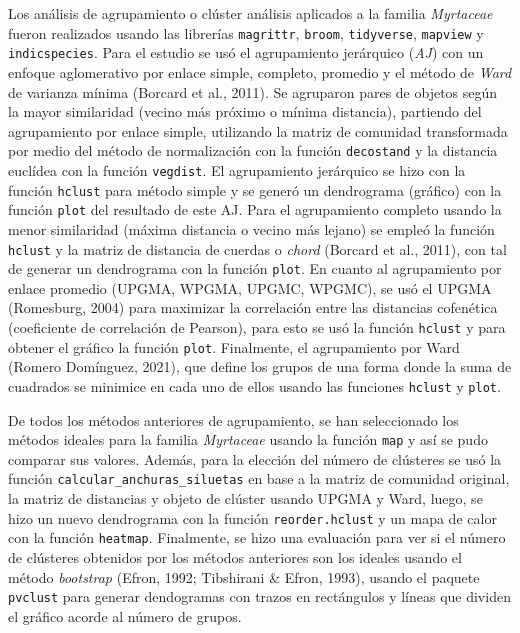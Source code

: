 \documentclass[11pt,]{article}
\begin{document}
Los análisis de agrupamiento o clúster análisis aplicados a la familia
\emph{Myrtaceae} fueron realizados usando las librerías
\texttt{magrittr}, \texttt{broom}, \texttt{tidyverse}, \texttt{mapview}
y \texttt{indicspecies}. Para el estudio se usó el agrupamiento
jerárquico (\emph{AJ}) con un enfoque aglomerativo por enlace simple,
completo, promedio y el método de \emph{Ward} de varianza mínima
(Borcard et al., 2011). Se agruparon pares de objetos según la mayor
similaridad (vecino más próximo o mínima distancia), partiendo del
agrupamiento por enlace simple, utilizando la matriz de comunidad
transformada por medio del método de normalización con la función
\texttt{decostand} y la distancia euclídea con la función
\texttt{vegdist}. El agrupamiento jerárquico se hizo con la función
\texttt{hclust} para método simple y se generó un dendrograma (gráfico)
con la función \texttt{plot} del resultado de este AJ. Para el
agrupamiento completo usando la menor similaridad (máxima distancia o
vecino más lejano) se empleó la función \texttt{hclust} y la matriz de
distancia de cuerdas o \emph{chord} (Borcard et al., 2011), con tal de
generar un dendrograma con la función \texttt{plot}. En cuanto al
agrupamiento por enlace promedio (UPGMA, WPGMA, UPGMC, WPGMC), se usó el
UPGMA (Romesburg, 2004) para maximizar la correlación entre las
distancias cofenética (coeficiente de correlación de Pearson), para esto
se usó la función \texttt{hclust} y para obtener el gráfico la función
\texttt{plot}. Finalmente, el agrupamiento por Ward (Romero Domínguez,
2021), que define los grupos de una forma donde la suma de cuadrados se
minimice en cada uno de ellos usando las funciones \texttt{hclust} y
\texttt{plot}.

De todos los métodos anteriores de agrupamiento, se han seleccionado los
métodos ideales para la familia \emph{Myrtaceae} usando la función
\texttt{map} y así se pudo comparar sus valores. Además, para la
elección del número de clústeres se usó la función
\texttt{calcular\_anchuras\_siluetas} en base a la matriz de comunidad
original, la matriz de distancias y objeto de clúster usando UPGMA y
Ward, luego, se hizo un nuevo dendrograma con la función
\texttt{reorder.hclust} y un mapa de calor con la función
\texttt{heatmap}. Finalmente, se hizo una evaluación para ver si el
número de clústeres obtenidos por los métodos anteriores son los ideales
usando el método \emph{bootstrap} (Efron, 1992; Tibshirani \& Efron,
1993), usando el paquete \texttt{pvclust} para generar dendogramas con
trazos en rectángulos y líneas que dividen el gráfico acorde al número
de grupos.
\end{document}
